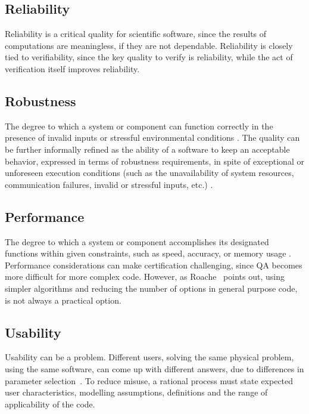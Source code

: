 \documentclass[12pt]{article}
\begin{document}
\subsection{Reliability}

Reliability is a critical quality for scientific software, since the results of
computations are meaningless, if they are not dependable.  Reliability is
closely tied to verifiability, since the key quality to verify is reliability,
while the act of verification itself improves reliability.

\subsection{Robustness}
The degree to which a system or component can function correctly in the presence of invalid inputs or stressful environmental conditions \cite{IEEEStdGlossarySET1990}.
The quality can be further informally refined as the ability of a software to keep an acceptable behavior, expressed in terms of robustness requirements, in spite of exceptional or unforeseen execution conditions (such as the unavailability of system resources, communication failures, invalid or stressful inputs, etc.) \cite{fernandez2005model}.

\subsection{Performance}

The degree to which a system or component accomplishes its designated functions within given constraints, such as speed, accuracy, or memory usage \cite{IEEEStdGlossarySET1990}.
Performance considerations can make certification challenging, since QA becomes more difficult for more complex code.  However, as Roache~\cite[p.~355]{Roache1998} points out, using simpler algorithms and reducing the number of options in general purpose code, is not always a practical option.

\subsection{Usability}

Usability can be a problem.  Different users, solving the same physical problem,
using the same software, can come up with different answers, due to differences
in parameter selection~\cite[p.~370]{Roache1998}.  To reduce misuse, a rational
process must state expected user characteristics, modelling assumptions,
definitions and the range of applicability of the code.
\end{document}
